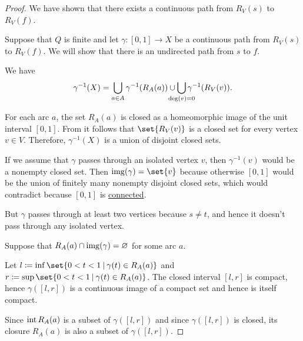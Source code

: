 \begin{proof}
  We have shown that there exists a continuous path from \( R_V(s) \) to \( R_V(f)  \).

   Suppose that \( Q \) is finite and let \( \gamma: [0, 1] \to X \) be a continuous path from \( R_V(s) \) to \( R_V(f) \). We will show that there is an undirected path from \( s \) to \( f \).

   We have
  \begin{equation}\label{eq:thm:directed multigraph_geometric_realization_paths/full_preimage}
    \gamma^{-1}(X) = \bigcup_{a \in A} \gamma^{-1}(R_A(a)) \cup \bigcup_{\mathclap{\deg(v) = 0}} \gamma^{-1}(R_V(v)).
  \end{equation}

  For each arc \( a \), the set \( R_A(a) \) is closed as a homeomorphic image of the unit interval \( [0, 1] \). From  it follows that \( \set{ R_V(v) } \) is a closed set for every vertex \( v \in V \). Therefore, \( \gamma^{-1}(X) \) is a union of disjoint closed sets.

  If we assume that \( \gamma \) passes through an isolated vertex \( v \), then \( \gamma^{-1}(v) \) would be a nonempty closed set. Then \( \img(\gamma) = \set{ v } \) because otherwise \( [0, 1] \) would be the union of finitely many nonempty disjoint closed sets, which would contradict  because \( [0, 1] \) is \hyperref[def:connected_space]{connected}.

  But \( \gamma \) passes through at least two vertices because \( s \neq t \), and hence it doesn't pass through any isolated vertex.

   Suppose that \( R_A(a) \cap \operatorname{img}(\gamma) = \varnothing \) for some arc \( a \).

  Let \( l \coloneqq \inf\set{ 0 < t < 1 \given \gamma(t) \in R_A(a) } \) and \( r \coloneqq \sup\set{ 0 < t < 1 \given \gamma(t) \in R_A(a) } \). The closed interval \( [l, r] \) is compact, hence \( \gamma([l, r]) \) is a continuous image of a compact set and hence is itself compact.

  Since \( \operatorname{int} R_A(a) \) is a subset of \( \gamma([l, r]) \) and since \( \gamma([l, r]) \) is closed, its closure \( R_A(a) \) is also a subset of \( \gamma([l, r]) \).


\end{proof}
